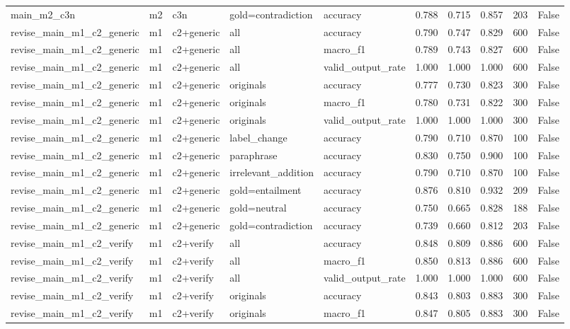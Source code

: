 \begin{tabular}{llllllllll}
main\_m2\_c3n & m2 & c3n & gold=contradiction & accuracy & 0.788 & 0.715 & 0.857 & 203 & False \\
revise\_main\_m1\_c2\_generic & m1 & c2+generic & all & accuracy & 0.790 & 0.747 & 0.829 & 600 & False \\
revise\_main\_m1\_c2\_generic & m1 & c2+generic & all & macro\_f1 & 0.789 & 0.743 & 0.827 & 600 & False \\
revise\_main\_m1\_c2\_generic & m1 & c2+generic & all & valid\_output\_rate & 1.000 & 1.000 & 1.000 & 600 & False \\
revise\_main\_m1\_c2\_generic & m1 & c2+generic & originals & accuracy & 0.777 & 0.730 & 0.823 & 300 & False \\
revise\_main\_m1\_c2\_generic & m1 & c2+generic & originals & macro\_f1 & 0.780 & 0.731 & 0.822 & 300 & False \\
revise\_main\_m1\_c2\_generic & m1 & c2+generic & originals & valid\_output\_rate & 1.000 & 1.000 & 1.000 & 300 & False \\
revise\_main\_m1\_c2\_generic & m1 & c2+generic & label\_change & accuracy & 0.790 & 0.710 & 0.870 & 100 & False \\
revise\_main\_m1\_c2\_generic & m1 & c2+generic & paraphrase & accuracy & 0.830 & 0.750 & 0.900 & 100 & False \\
revise\_main\_m1\_c2\_generic & m1 & c2+generic & irrelevant\_addition & accuracy & 0.790 & 0.710 & 0.870 & 100 & False \\
revise\_main\_m1\_c2\_generic & m1 & c2+generic & gold=entailment & accuracy & 0.876 & 0.810 & 0.932 & 209 & False \\
revise\_main\_m1\_c2\_generic & m1 & c2+generic & gold=neutral & accuracy & 0.750 & 0.665 & 0.828 & 188 & False \\
revise\_main\_m1\_c2\_generic & m1 & c2+generic & gold=contradiction & accuracy & 0.739 & 0.660 & 0.812 & 203 & False \\
revise\_main\_m1\_c2\_verify & m1 & c2+verify & all & accuracy & 0.848 & 0.809 & 0.886 & 600 & False \\
revise\_main\_m1\_c2\_verify & m1 & c2+verify & all & macro\_f1 & 0.850 & 0.813 & 0.886 & 600 & False \\
revise\_main\_m1\_c2\_verify & m1 & c2+verify & all & valid\_output\_rate & 1.000 & 1.000 & 1.000 & 600 & False \\
revise\_main\_m1\_c2\_verify & m1 & c2+verify & originals & accuracy & 0.843 & 0.803 & 0.883 & 300 & False \\
revise\_main\_m1\_c2\_verify & m1 & c2+verify & originals & macro\_f1 & 0.847 & 0.805 & 0.883 & 300 & False \\

\end{tabular}
